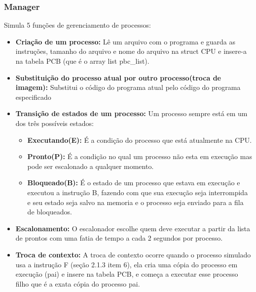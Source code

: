 \documentclass[a4paper, 12pt]{article}
\begin{document}
\subsubsection{Manager} Simula 5 funções de gerenciamento de processos:
\begin{itemize}
\item \textbf{Criação de um processo:} Lê um arquivo com o programa e guarda as instruções, tamanho do arquivo e nome do arquivo na struct CPU e insere-a na tabela PCB (que é o array list pbc\_list).

\item \textbf{Substituição do processo atual por outro processo(troca de imagem):} Substitui o código do programa atual pelo código do programa especificado 

\item \textbf{Transição de estados de um processo:} Um processo sempre está em um dos três possíveis estados:
\begin{itemize}
	\item \textbf{Executando(E):} É a condição do processo que está atualmente na CPU.
	\item \textbf{Pronto(P):} É a condição no qual um processo não esta em execução mas pode ser escalonado a qualquer momento.
	\item \textbf{Bloqueado(B):} É o estado de um processo que estava em execução e executou a instrução B, fazendo com que sua execução seja interrompida e seu estado seja salvo na memoria e o processo seja enviado para a fila de bloqueados.
\end{itemize}

\item \textbf{Escalonamento:}
O escalonador escolhe quem deve executar a partir da lista de prontos com uma fatia de tempo a cada 2 segundos por processo.

\item \textbf{Troca de contexto:} A troca de contexto ocorre quando o processo simulado usa a instrução F (seção 2.1.3 item 6), ela cria uma cópia do processo em execução (pai) e insere na tabela PCB, e começa a executar esse processo filho que é a exata cópia do processo pai.
\end{itemize}
\end{document}
